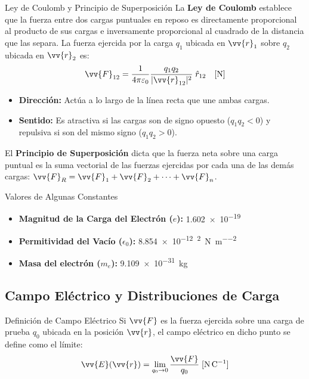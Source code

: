 \documentclass[11pt]{article}
\begin{document}
\begin{boxTeoria}{Ley de Coulomb y Principio de Superposición}
    La \textbf{Ley de Coulomb} establece que la fuerza entre dos cargas puntuales en reposo es directamente proporcional al producto de sus cargas e inversamente proporcional al cuadrado de la distancia que las separa. La fuerza ejercida por la carga $q_1$ ubicada en $\vv{r}_1$ sobre $q_2$ ubicada en $\vv{r}_2$ es:
    \begin{equation*}
        \vv{F}_{12} = \frac{1}{4\pi\varepsilon_0} \frac{q_1 q_2}{|\vv{r}_{12}|^2} \;\hat{r}_{12} \quad [\unit{\N}]
    \end{equation*}
    \begin{itemize}
        \item \textbf{Dirección:} Actúa a lo largo de la línea recta que une ambas cargas.
        \item \textbf{Sentido:} Es atractiva si las cargas son de signo opuesto ($q_1 q_2 < 0$) y repulsiva si son del mismo signo ($q_1 q_2 > 0$).
    \end{itemize}

    El \textbf{Principio de Superposición} dicta que la fuerza neta sobre una carga puntual es la suma vectorial de las fuerzas ejercidas por cada una de las demás cargas: $\vv{F}_{R} = \vv{F}_{1} + \vv{F}_{2} + \dots + \vv{F}_{n}$.
\end{boxTeoria}

\begin{boxNota}{Valores de Algunas Constantes}
    \begin{itemize}
        \item \textbf{Magnitud de la Carga del Electrón ($e$):} \qty{1.602e-19}{\C}
        \item \textbf{Permitividad del Vacío ($\epsilon_0$):} \qty{8.854e-12}{\C\squared\per\N\per\meter\squared}
        \item \textbf{Masa del electrón ($m_e$):} \qty{9.109e-31}{\kg}
    \end{itemize}
\end{boxNota}

\subsection*{Campo Eléctrico y Distribuciones de Carga}

\begin{boxTeoria}{Definición de Campo Eléctrico}
    Si $\vv{F}$ es la fuerza ejercida sobre una carga de prueba $q_0$ ubicada en la posición $\vv{r}$, el campo eléctrico en dicho punto se define como el límite:
    \begin{equation*}
        \vv{E}(\vv{r}) = \lim_{q_0 \to 0} \frac{\vv{F}}{q_0} \; [\unit{\N\per\C}]
    \end{equation*}
\end{boxTeoria}
\end{document}
